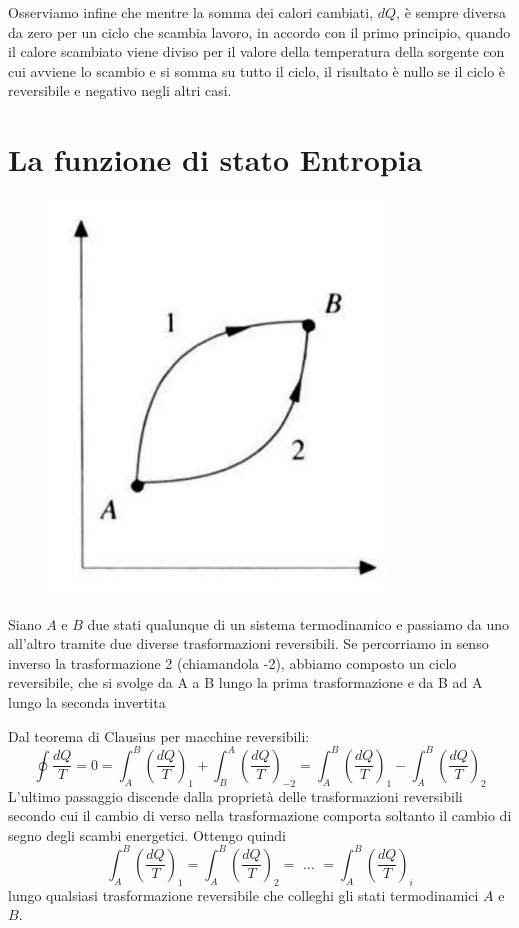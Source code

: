 \documentclass[class=book, crop=false, oneside, 12pt]{standalone}
\begin{document}
Osserviamo infine che mentre la somma dei calori cambiati, \(d Q\), è sempre diversa da zero per un ciclo che scambia lavoro, in accordo con il primo principio, quando il calore scambiato viene diviso per il valore della temperatura della sorgente con cui avviene lo scambio e si somma su tutto il ciclo, il risultato è nullo se il ciclo è reversibile e negativo negli altri casi. 

\section{La funzione di stato Entropia}
\begin{figure}[h]
    \includegraphics[scale=0.4]{trasformazioni_12.png}
    \centering
    \caption{}
    \label{trasformazione_12}
\end{figure}
Siano \(A\) e \(B\) due stati qualunque di un sistema termodinamico e passiamo da uno all'altro tramite due diverse trasformazioni reversibili.
Se percorriamo in senso inverso la trasformazione 2 (chiamandola -2), abbiamo composto un ciclo reversibile, che si svolge da A a B lungo la prima trasformazione e da B ad A lungo la seconda invertita

Dal teorema di Clausius per macchine reversibili:
\begin{equation*}
    \oint \frac{d Q}{T} = 0 = \int_A^B \left(\frac{d Q}{T}\right)_1 + \int_B^A \left(\frac{d Q}{T}\right)_{-2} = \int_A^B \left(\frac{d Q}{T}\right)_1 - \int_A^B \left(\frac{d Q}{T}\right)_{2} 
\end{equation*}
L'ultimo passaggio discende dalla proprietà delle trasformazioni reversibili secondo cui il cambio di verso nella trasformazione comporta soltanto il cambio di segno degli scambi energetici. 
Ottengo quindi
\begin{equation*}
    \int_A^B \left(\frac{d Q}{T}\right)_1 = \int_A^B \left(\frac{d Q}{T}\right)_2 = \text{ ... } = \int_A^B \left(\frac{d Q}{T}\right)_i
\end{equation*}
lungo qualsiasi trasformazione reversibile che colleghi gli stati termodinamici \(A\) e \(B\). 
\end{document}
